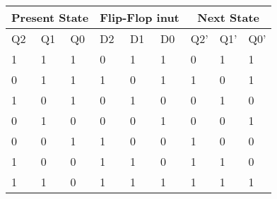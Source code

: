 \label{table:2}
\begin{tabular}{|p{1.2cm}|p{1.2cm}|p{1.2cm}|p{1.2cm}|p{1.2cm}|p{1.2cm}|p{1.2cm}|p{1.2cm}|p{1.2cm}|}    
\hline                                      
\multicolumn{3}{|c|}{Present State} & \multicolumn{3}{|c|}{Flip-Flop inut} & \multicolumn{3}{|c|}{Next State}\\                                   
\hline                                    
Q2 & Q1 & Q0 & D2 & D1 & D0 & Q2' & Q1' & Q0'\\  
\hline                                 
1 & 1 & 1 & 0 & 1 & 1 & 0 & 1 & 1\\         
\hline                                    
0 & 1 & 1 & 1 & 0 & 1 & 1 & 0 & 1\\       
\hline                                  
1 & 0 & 1 & 0 & 1 & 0 & 0 & 1 & 0\\    
\hline                                   
0 & 1 & 0 & 0 & 0 & 1 & 0 & 0 & 1\\      
\hline                                   
0 & 0 & 1 & 1 & 0 & 0 & 1 & 0 & 0\\        
\hline                                     
1 & 0 & 0 & 1 & 1 & 0 & 1 & 1 & 0\\     
\hline                                     
1 & 1 & 0 & 1 & 1 & 1 & 1 & 1 & 1\\     
\hline                   
\end{tabular}
